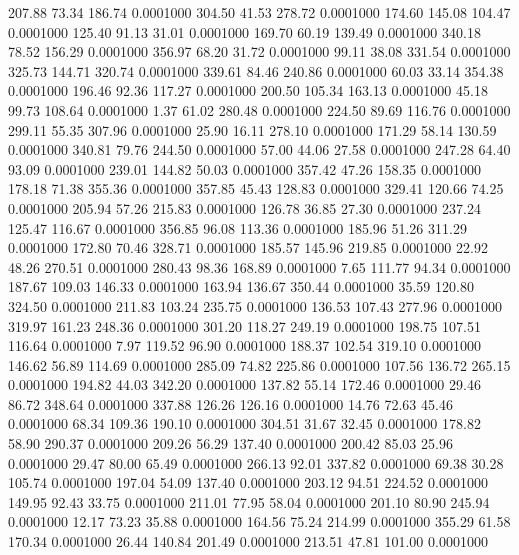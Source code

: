  207.88   73.34  186.74   0.0001000
 304.50   41.53  278.72   0.0001000
 174.60  145.08  104.47   0.0001000
 125.40   91.13   31.01   0.0001000
 169.70   60.19  139.49   0.0001000
 340.18   78.52  156.29   0.0001000
 356.97   68.20   31.72   0.0001000
  99.11   38.08  331.54   0.0001000
 325.73  144.71  320.74   0.0001000
 339.61   84.46  240.86   0.0001000
  60.03   33.14  354.38   0.0001000
 196.46   92.36  117.27   0.0001000
 200.50  105.34  163.13   0.0001000
  45.18   99.73  108.64   0.0001000
   1.37   61.02  280.48   0.0001000
 224.50   89.69  116.76   0.0001000
 299.11   55.35  307.96   0.0001000
  25.90   16.11  278.10   0.0001000
 171.29   58.14  130.59   0.0001000
 340.81   79.76  244.50   0.0001000
  57.00   44.06   27.58   0.0001000
 247.28   64.40   93.09   0.0001000
 239.01  144.82   50.03   0.0001000
 357.42   47.26  158.35   0.0001000
 178.18   71.38  355.36   0.0001000
 357.85   45.43  128.83   0.0001000
 329.41  120.66   74.25   0.0001000
 205.94   57.26  215.83   0.0001000
 126.78   36.85   27.30   0.0001000
 237.24  125.47  116.67   0.0001000
 356.85   96.08  113.36   0.0001000
 185.96   51.26  311.29   0.0001000
 172.80   70.46  328.71   0.0001000
 185.57  145.96  219.85   0.0001000
  22.92   48.26  270.51   0.0001000
 280.43   98.36  168.89   0.0001000
   7.65  111.77   94.34   0.0001000
 187.67  109.03  146.33   0.0001000
 163.94  136.67  350.44   0.0001000
  35.59  120.80  324.50   0.0001000
 211.83  103.24  235.75   0.0001000
 136.53  107.43  277.96   0.0001000
 319.97  161.23  248.36   0.0001000
 301.20  118.27  249.19   0.0001000
 198.75  107.51  116.64   0.0001000
   7.97  119.52   96.90   0.0001000
 188.37  102.54  319.10   0.0001000
 146.62   56.89  114.69   0.0001000
 285.09   74.82  225.86   0.0001000
 107.56  136.72  265.15   0.0001000
 194.82   44.03  342.20   0.0001000
 137.82   55.14  172.46   0.0001000
  29.46   86.72  348.64   0.0001000
 337.88  126.26  126.16   0.0001000
  14.76   72.63   45.46   0.0001000
  68.34  109.36  190.10   0.0001000
 304.51   31.67   32.45   0.0001000
 178.82   58.90  290.37   0.0001000
 209.26   56.29  137.40   0.0001000
 200.42   85.03   25.96   0.0001000
  29.47   80.00   65.49   0.0001000
 266.13   92.01  337.82   0.0001000
  69.38   30.28  105.74   0.0001000
 197.04   54.09  137.40   0.0001000
 203.12   94.51  224.52   0.0001000
 149.95   92.43   33.75   0.0001000
 211.01   77.95   58.04   0.0001000
 201.10   80.90  245.94   0.0001000
  12.17   73.23   35.88   0.0001000
 164.56   75.24  214.99   0.0001000
 355.29   61.58  170.34   0.0001000
  26.44  140.84  201.49   0.0001000
 213.51   47.81  101.00   0.0001000
